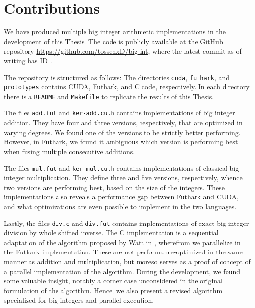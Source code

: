 \section{Contributions}
\label{sec:cont}

We have produced multiple big integer arithmetic implementations in the
development of this Thesis. The code is publicly available at the GitHub
repository \url{https://github.com/tossenxD/big-int}, where the latest commit as
of writing has ID {}.

The repository is structured as follows: The directories \texttt{cuda},
\texttt{futhark}, and \texttt{prototypes} contains CUDA, Futhark, and C code,
respectively. In each directory there is a \texttt{README} and \texttt{Makefile}
to replicate the results of this Thesis.

The files \texttt{add.fut} and \texttt{ker-add.cu.h} contains implementations of
big integer addition. They have four and three versions, respectively, that are
optimized in varying degrees. We found one of the versions to be strictly better
performing. However, in Futhark, we found it ambiguous which version is
performing best when fusing multiple consecutive additions.

The files \texttt{mul.fut} and \texttt{ker-mul.cu.h} contains implementations of
classical big integer multiplication. They define three and five versions,
respectively, whence two versions are performing best, based on the size of the
integers. These implementations also reveals a performance gap between Futhark
and CUDA, and what optimizations are even possible to implement in the two
languages.

Lastly, the files \texttt{div.c} and \texttt{div.fut} contains implementations
of exact big integer division by whole shifted inverse. The C implementation is
a sequential adaptation of the algorithm proposed by Watt in
\cite{watt2023efficient}, wherefrom we parallelize in the Futhark
implementation. These are not performance-optimized in the same manner as
addition and multiplication, but moreso serves as a proof of concept of a
parallel implementation of the algorithm. During the development, we found some
valuable insight, notably a corner case unconsidered in the original formulation
of the algorithm. Hence, we also present a revised algorithm specialized for big
integers and parallel execution.

